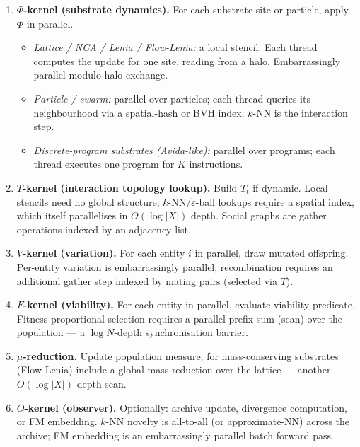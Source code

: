 \documentclass[journal]{IEEEtran}
\theoremstyle{plain}
\theoremstyle{definition}
\theoremstyle{plain}
\begin{document}
\begin{enumerate}[leftmargin=2em,itemsep=4pt]
  \item \textbf{$\Phi$-kernel (substrate dynamics).} For each substrate site
    or particle, apply $\Phi$ in parallel.
    \begin{itemize}[leftmargin=1.2em,itemsep=2pt]
      \item \emph{Lattice / NCA / Lenia / Flow-Lenia:} a local stencil. Each
        thread computes the update for one site, reading from a halo.
        Embarrassingly parallel modulo halo exchange.
      \item \emph{Particle / swarm:} parallel over particles; each thread
        queries its neighbourhood via a spatial-hash or BVH index. $k$-NN
        is the interaction step.
      \item \emph{Discrete-program substrates (Avida-like):} parallel over
        programs; each thread executes one program for $K$ instructions.
    \end{itemize}
  \item \textbf{$T$-kernel (interaction topology lookup).} Build $T_t$ if
    dynamic. Local stencils need no global structure; $k$-NN/$\varepsilon$-ball
    lookups require a spatial index, which itself parallelises in
    $O(\log |X|)$ depth. Social graphs are gather operations indexed by an
    adjacency list.
  \item \textbf{$V$-kernel (variation).} For each entity $i$ in parallel,
    draw mutated offspring. Per-entity variation is embarrassingly parallel;
    recombination requires an additional gather step indexed by mating
    pairs (selected via $T$).
  \item \textbf{$F$-kernel (viability).} For each entity in parallel,
    evaluate viability predicate. Fitness-proportional selection requires a
    parallel prefix sum (scan) over the population --- a $\log N$-depth
    synchronisation barrier.
  \item \textbf{$\mu$-reduction.} Update population measure; for
    mass-conserving substrates (Flow-Lenia) include a global mass reduction
    over the lattice --- another $O(\log |X|)$-depth scan.
  \item \textbf{$O$-kernel (observer).} Optionally: archive update,
    divergence computation, or FM embedding. $k$-NN novelty is all-to-all
    (or approximate-NN) across the archive; FM embedding is an
    embarrassingly parallel batch forward pass.
\end{enumerate}
\end{document}
